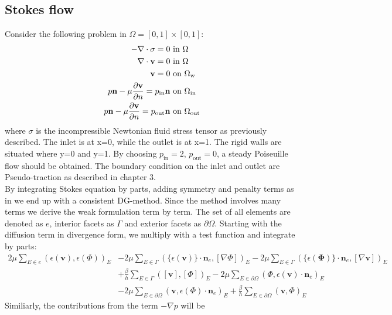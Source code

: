 \subsection{Stokes flow}
Consider the following problem in $\Omega = [0,1]\times[0,1]$:
\begin{align}
-\nabla \cdot \sigma = 0 & \text{ in } \Omega \\
\nabla \cdot \mathbf{v} =  0 & \text{ in } \Omega\\
\mathbf{v} = 0 & \text{ on } \Omega_{\text{w}} \\
p \mathbf{n} - \mu \frac{\partial \mathbf{v}}{\partial n} = p_{\text{in}}\mathbf{n} & \text{ on } \Omega_{\text{in}} \\
p \mathbf{n} - \mu \frac{\partial \mathbf{v}}{\partial n} = p_{\text{out}}\mathbf{n} & \text{ on } \Omega_{\text{out}} \\
\end{align}
where $\sigma$ is the incompressible Newtonian fluid stress tensor as previously described. The inlet is at x=0, while the outlet is at x=1. The rigid walls are situated where y=0 and y=1. By choosing $p_{\text{in}} = 2$, $p_{\text{out}} = 0$, a steady Poiseuille flow should be obtained. The boundary condition on the inlet and outlet are Pseudo-traction as described in chapter 3. \\
By integrating Stokes equation by parts, adding symmetry and penalty terms as in \cite{Rivi05} we end up with a consistent DG-method. Since the method involves many terms we derive the weak formulation term by term. The set of all elements are denoted as $e$, interior facets as $\Gamma$ and exterior facets as $\partial \Omega$. Starting with the diffusion term in divergence form, we multiply with a test function and integrate by parts:
\begin{align}
	2\mu \sum_{E \in e} (\epsilon(\mathbf{v}), \epsilon(\Phi))_E &
   -2\mu \sum_{E \in \Gamma}(\{\epsilon(\mathbf{v}) \} \cdot \mathbf{n}_e, [ \nabla \Phi ])_E 
   -2\mu \sum_{E \in \Gamma}(\{\epsilon(\mathbf{\Phi}) \} \cdot \mathbf{n}_e, [ \nabla \mathbf{v} ])_E \\
	& + \frac{\beta}{h} \sum_{E \in \Gamma}([\mathbf{v}],[\Phi])_E 
	-2\mu \sum_{E \in \partial \Omega}(\Phi,  \epsilon( \mathbf{v}) \cdot \mathbf{n}_e)_E \\
   & -2\mu \sum_{E \in \partial \Omega}(\mathbf{v},  \epsilon( \Phi)  \cdot \mathbf{n}_e)_E 
	+ \frac{\beta}{h} \sum_{E \in \partial \Omega}(\mathbf{v},\Phi)_E 
 \label {Diffusion}
\end{align}
Similiarly, the contributions from the term $-\nabla p$ will be
